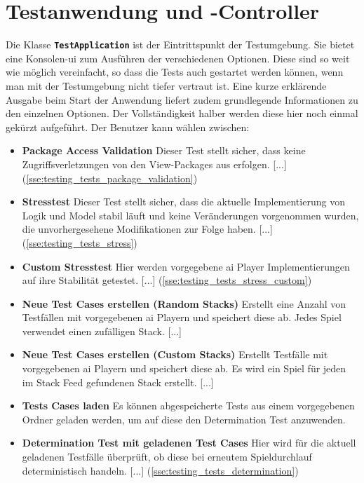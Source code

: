 \documentclass[
							a4paper, 
							11pt, 
							openany, 
							liststotoc,
							parskip=half, 
   							headings=normal
						]{scrreprt}
\begin{document}
{\section{Testanwendung und -Controller} \label{se:testing_controller_test}
Die Klasse \textbf{\texttt{TestApplication}} ist der Eintrittspunkt der Testumgebung.
Sie bietet eine Konsolen-\acs{ui} zum Ausführen der verschiedenen Optionen. Diese sind so weit wie möglich vereinfacht, so dass die Tests auch gestartet werden können, wenn man mit der Testumgebung nicht tiefer vertraut ist.\newline
Eine kurze erklärende Ausgabe beim Start der Anwendung liefert zudem grundlegende Informationen zu den einzelnen Optionen. Der Vollständigkeit halber werden diese hier noch einmal gekürzt aufgeführt.\newline
Der Benutzer kann wählen zwischen:
\begin{itemize}
\item \textbf{Package Access Validation} Dieser Test stellt sicher, dass keine Zugriffsverletzungen von den View-Packages aus erfolgen. [...] (\autoref{sse:testing_tests_package_validation})
\item \textbf{Stresstest} Dieser Test stellt sicher, dass die aktuelle Implementierung von Logik und Model stabil läuft und keine Veränderungen vorgenommen wurden, die unvorhergesehene Modifikationen zur Folge haben. [...] (\autoref{sse:testing_tests_stress})                   
\item \textbf{Custom Stresstest} Hier werden vorgegebene \acs{ai} Player Implementierungen auf ihre Stabilität getestet. [...] (\autoref{sse:testing_tests_stress_custom})            
\item \textbf{Neue Test Cases erstellen (Random Stacks)} Erstellt eine Anzahl von Test\-fäl\-len mit vorgegebenen \acs{ai} Playern und speichert diese ab. Jedes Spiel verwendet einen zufälligen Stack. [...]
\item \textbf{Neue Test Cases erstellen (Custom Stacks)} Erstellt Test\-fäl\-le mit vorgegebenen \acs{ai} Playern und speichert diese ab. Es wird ein Spiel für jeden im Stack Feed gefundenen Stack erstellt. [...]
\item \textbf{Tests Cases laden} Es können abgespeicherte Tests aus einem vorgegebenen Ordner geladen werden, um auf diese den Determination Test anzuwenden.             
\item \textbf{Determination Test mit geladenen Test Cases} Hier wird für die aktuell geladenen Testfälle überprüft, ob diese bei erneutem Spieldurchlauf deterministisch handeln. [...] (\autoref{sse:testing_tests_determination})

\end{itemize}}
\end{document}
